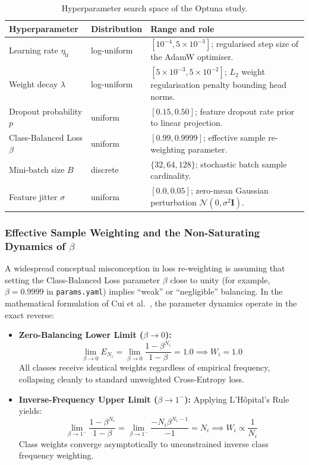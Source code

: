 \begin{table}[htbp]
\centering
\caption{Hyperparameter search space of the Optuna study.}
\label{tab:search_space}
\begin{tabularx}{\textwidth}{@{}l l X@{}}
\toprule
\textbf{Hyperparameter} & \textbf{Distribution} & \textbf{Range and role} \\
\midrule
Learning rate $\eta_{\text{lr}}$ & log-uniform & $[10^{-4}, 5 \times 10^{-3}]$; regularised step size of the AdamW optimiser. \\
Weight decay $\lambda$ & log-uniform & $[5 \times 10^{-3}, 5 \times 10^{-2}]$; $L_2$ weight regularisation penalty bounding head norms. \\
Dropout probability $p$ & uniform & $[0.15, 0.50]$; feature dropout rate prior to linear projection. \\
Class-Balanced Loss $\beta$ & uniform & $[0.99, 0.9999]$; effective sample re-weighting parameter. \\
Mini-batch size $B$ & discrete & $\{32, 64, 128\}$; stochastic batch sample cardinality. \\
Feature jitter $\sigma$ & uniform & $[0.0, 0.05]$; zero-mean Gaussian perturbation $\mathcal{N}(0, \sigma^2 \mathbf{I})$. \\
\bottomrule
\end{tabularx}
\end{table}

\subsubsection{Effective Sample Weighting and the Non-Saturating Dynamics of \texorpdfstring{$\beta$}{beta}}
\label{sec:cb_beta_dynamics}

A widespread conceptual misconception in loss re-weighting is assuming that setting the Class-Balanced Loss parameter $\beta$ close to unity (for example, $\beta = 0.9999$ in \nolinkurl{params.yaml}) implies ``weak'' or ``negligible'' balancing. In the mathematical formulation of Cui et al.~\cite{cui2019classbalanced}, the parameter dynamics operate in the exact reverse:

\begin{itemize}[leftmargin=1.5em]
    \item \textbf{Zero-Balancing Lower Limit ($\beta \to 0$):}
    \begin{equation}
      \lim_{\beta \to 0} E_{N_i} = \lim_{\beta \to 0} \frac{1 - \beta^{N_i}}{1 - \beta} = 1.0 \implies W_i = 1.0
    \end{equation}
    All classes receive identical weights regardless of empirical frequency, collapsing cleanly to standard unweighted Cross-Entropy loss.
    \item \textbf{Inverse-Frequency Upper Limit ($\beta \to 1^-$):}
    Applying L'H\^{o}pital's Rule yields:
    \begin{equation}
      \lim_{\beta \to 1^-} \frac{1 - \beta^{N_i}}{1 - \beta} = \lim_{\beta \to 1^-} \frac{-N_i \beta^{N_i - 1}}{-1} = N_i \implies W_i \propto \frac{1}{N_i}
    \end{equation}
    Class weights converge asymptotically to unconstrained inverse class frequency weighting.
\end{itemize}


